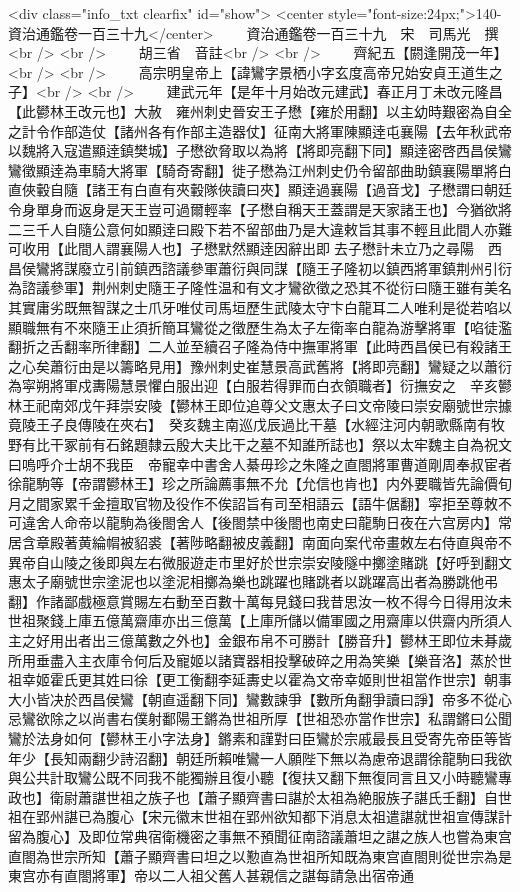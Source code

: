 <div class="info_txt clearfix" id="show">
<center style="font-size:24px;">140-資治通鑑卷一百三十九</center>
  　　資治通鑑卷一百三十九　宋　司馬光　撰<br />
<br />
　　胡三省　音註<br />
<br />
　　齊紀五【閼逢開茂一年】<br />
<br />
　　高宗明皇帝上【諱鸞字景栖小字玄度高帝兄始安貞王道生之子】<br />
<br />
　　建武元年【是年十月始改元建武】春正月丁未改元隆昌【此鬰林王改元也】大赦　雍州刺史晉安王子懋【雍於用翻】以主幼時艱密為自全之計令作部造仗【諸州各有作部主造器仗】征南大將軍陳顯逹屯襄陽【去年秋武帝以魏將入寇遣顯逹鎮樊城】子懋欲脅取以為將【將即亮翻下同】顯逹密啓西昌侯鸞鸞徵顯逹為車騎大將軍【騎奇寄翻】徙子懋為江州刺史仍令留部曲助鎮襄陽單將白直俠轂自隨【諸王有白直有夾轂隊俠讀曰夾】顯逹過襄陽【過音戈】子懋謂曰朝廷令身單身而返身是天王豈可過爾輕率【子懋自稱天王蓋謂是天家諸王也】今猶欲將二三千人自隨公意何如顯逹曰殿下若不留部曲乃是大違敕旨其事不輕且此間人亦難可收用【此間人謂襄陽人也】子懋默然顯逹因辭出即去子懋計未立乃之尋陽　西昌侯鸞將謀廢立引前鎮西諮議參軍蕭衍與同謀【隨王子隆初以鎮西將軍鎮荆州引衍為諮議參軍】荆州刺史隨王子隆性温和有文才鸞欲徵之恐其不從衍曰隨王雖有美名其實庸劣既無智謀之士爪牙唯仗司馬垣歷生武陵太守卞白龍耳二人唯利是從若啗以顯職無有不來隨王止須折簡耳鸞從之徵歷生為太子左衛率白龍為游擊將軍【啗徒濫翻折之舌翻率所律翻】二人並至續召子隆為侍中撫軍將軍【此時西昌侯已有殺諸王之心矣蕭衍由是以籌略見用】豫州刺史崔慧景高武舊將【將即亮翻】鸞疑之以蕭衍為寜朔將軍戍夀陽慧景懼白服出迎【白服若得罪而白衣領職者】衍撫安之　辛亥鬰林王祀南郊戊午拜崇安陵【鬰林王即位追尊父文惠太子曰文帝陵曰崇安廟號世宗據竟陵王子良傳陵在夾右】　癸亥魏主南巡戊辰過比干墓【水經注河内朝歌縣南有牧野有比干冢前有石銘題隸云殷大夫比干之墓不知誰所誌也】祭以太牢魏主自為祝文曰嗚呼介士胡不我臣　帝寵幸中書舍人綦毋珍之朱隆之直閤將軍曹道剛周奉叔宦者徐龍駒等【帝謂鬰林王】珍之所論薦事無不允【允信也肯也】内外要職皆先論價旬月之間家累千金擅取官物及役作不俟詔旨有司至相語云【語牛倨翻】寜拒至尊敇不可違舍人命帝以龍駒為後閤舍人【後閤禁中後閤也南史曰龍駒日夜在六宫房内】常居含章殿著黄綸㡌被貂裘【著陟略翻被皮義翻】南面向案代帝畫敇左右侍直與帝不異帝自山陵之後即與左右微服遊走市里好於世宗崇安陵隧中擲塗賭跳【好呼到翻文惠太子廟號世宗塗泥也以塗泥相擲為樂也跳躍也賭跳者以跳躍高出者為勝跳他弔翻】作諸鄙戲極意賞賜左右動至百數十萬每見錢曰我昔思汝一枚不得今日得用汝未世祖聚錢上庫五億萬齋庫亦出三億萬【上庫所儲以備軍國之用齋庫以供齋内所須人主之好用出者出三億萬數之外也】金銀布帛不可勝計【勝音升】鬰林王即位未朞歲所用垂盡入主衣庫令何后及寵姬以諸寶器相投擊破碎之用為笑樂【樂音洛】蒸於世祖幸姬霍氏更其姓曰徐【更工衡翻李延夀史以霍為文帝幸姬則世祖當作世宗】朝事大小皆决於西昌侯鸞【朝直遥翻下同】鸞數諫爭【數所角翻爭讀曰諍】帝多不從心忌鸞欲除之以尚書右僕射鄱陽王鏘為世祖所厚【世祖恐亦當作世宗】私謂鏘曰公聞鸞於法身如何【鬰林王小字法身】鏘素和謹對曰臣鸞於宗戚最長且受寄先帝臣等皆年少【長知兩翻少詩沼翻】朝廷所賴唯鸞一人願陛下無以為慮帝退謂徐龍駒曰我欲與公共計取鸞公既不同我不能獨辦且復小聽【復扶又翻下無復同言且又小時聽鸞專政也】衛尉蕭諶世祖之族子也【蕭子顯齊書曰諶於太祖為絶服族子諶氏壬翻】自世祖在郢州諶已為腹心【宋元徽末世祖在郢州欲知都下消息太祖遣諶就世祖宣傳謀計留為腹心】及即位常典宿衛機密之事無不預聞征南諮議蕭坦之諶之族人也嘗為東宫直閤為世宗所知【蕭子顯齊書曰坦之以懃直為世祖所知既為東宫直閤則從世宗為是東宫亦有直閤將軍】帝以二人祖父舊人甚親信之諶每請急出宿帝通